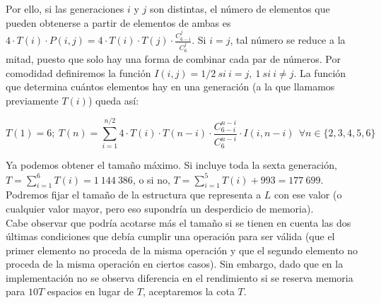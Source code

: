 Por ello, si las generaciones $i$ y $j$ son distintas, el número de elementos que pueden obtenerse a partir de elementos de ambas es $\displaystyle 4 \cdot T(i) \cdot P(i,j) = 4 \cdot T(i) \cdot T(j) \cdot \frac {C_{6-i}^j} {C_6^j}$. Si $i=j$, tal número se reduce a la mitad, puesto que solo hay una forma de combinar cada par de números. Por comodidad definiremos la función $I(i,j) = 1/2\ si\ i=j,\ 1\ si\ i \ne j$. La función que determina cuántos elementos hay en una generación (a la que llamamos previamente $T(i)$) queda así:

$$T(1) = 6;\ T(n) = \sum_{i=1}^{n/2} 4 \cdot T(i) \cdot T(n-i) \cdot \frac {C_{6-i}^{n-i}} {C_6^{n-i}} \cdot I(i,n-i) \ \ \forall n \in \{2,3,4,5,6\}$$

Ya podemos obtener el tamaño máximo. Si incluye toda la sexta generación, $\displaystyle T = \sum_{i=1}^6 T(i) = 1\ 144\ 386$, o si no, $\displaystyle T = \sum_{i=1}^5 T(i) + 993 = 177\ 699$. Podremos fijar el tamaño de la estructura que representa a $L$ con ese valor (o cualquier valor mayor, pero eso supondría un desperdicio de memoria). \\

Cabe observar que podría acotarse más el tamaño si se tienen en cuenta las dos últimas condiciones que debía cumplir una operación para ser válida (que el primer elemento no proceda de la misma operación y que el segundo elemento no proceda de la misma operación en ciertos casos). Sin embargo, dado que en la implementación no se observa diferencia en el rendimiento si se reserva memoria para $10T$ espacios en lugar de $T$, aceptaremos la cota $T$.